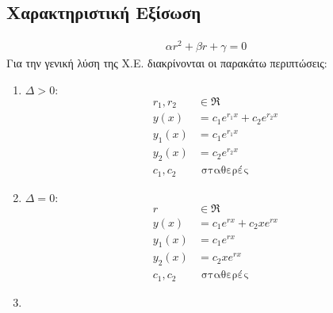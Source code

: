 \documentclass[]{extarticle}
\begin{document}
\begin{multicols*}{2}
    \section{Χαρακτηριστική Eξίσωση}
    \begin{equation*}
        \begin{aligned}
            \alpha r^2 + \beta r + \gamma = 0
        \end{aligned}
    \end{equation*}
    Για την γενική λύση της Χ.Ε. διακρίνονται οι παρακάτω περιπτώσεις:
    \begin{enumerate}
        \item \begin{math}
                  \Delta   > 0 :
              \end{math}
              \begin{equation*}
                  \begin{aligned}
                      r_1, r_2 & \in \Re                       \\
                      y(x)     & = c_1 e^{r_1x} + c_2 e^{r_2x} \\
                      y_1(x)   & = c_1 e^{r_1x}                \\
                      y_2(x)   & = c_2 e^{r_2x}                \\
                      c_1, c_2 & \text{ σταθερές}
                  \end{aligned}
              \end{equation*}
        \item \begin{math}
                  \Delta   = 0 :
              \end{math}
              \begin{equation*}
                  \begin{aligned}
                      r        & \in \Re                     \\
                      y(x)     & = c_1 e^{rx} + c_2 x e^{rx} \\
                      y_1(x)   & = c_1 e^{rx}                \\
                      y_2(x)   & = c_2 x e^{rx}              \\
                      c_1, c_2 & \text{ σταθερές}
                  \end{aligned}
              \end{equation*}
        \item \begin{math}

\end{math}
\end{enumerate}
\end{multicols*}
\end{document}
